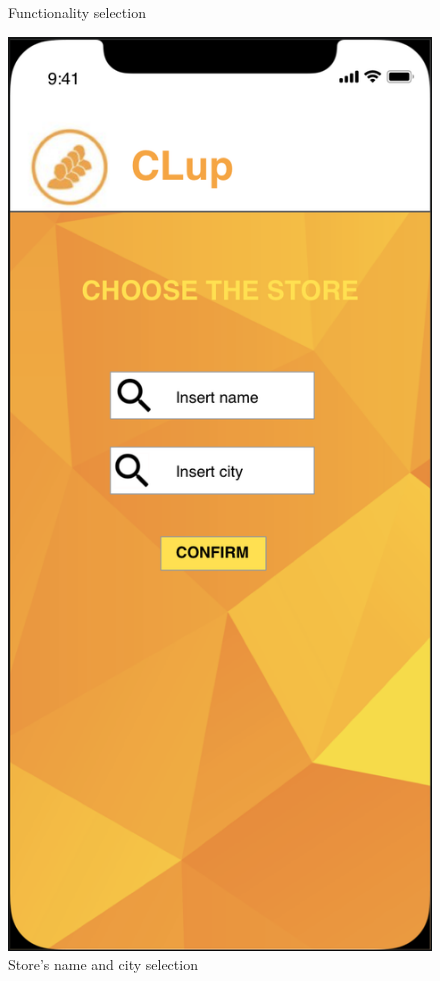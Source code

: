 \documentclass{article}
\begin{document}
\begin{figure}[H]
\begin{minipage}[b]{0.4\textwidth}
\caption{Functionality selection}
\end{minipage}
\hfill
\begin{minipage}[b]{0.4\textwidth}
\centering
\includegraphics[width=\textwidth]{ChooseStore.png}
\caption{Store's name and city selection}
\end{minipage}
\end{figure}
\end{document}
